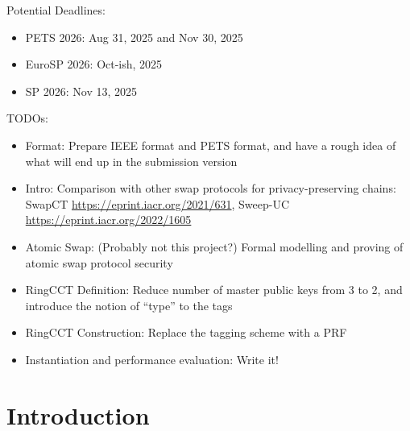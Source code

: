 
\begin{todobox}
    Potential Deadlines: 
    \begin{itemize}
        \item PETS 2026: Aug 31, 2025 and Nov 30, 2025
        \item EuroSP 2026: Oct-ish, 2025 
        \item SP 2026: Nov 13, 2025 
    \end{itemize}

    TODOs:
    \begin{itemize}
        \item Format: Prepare IEEE format and PETS format, and have a rough idea of what will end up in the submission version
        \item Intro: Comparison with other swap protocols for privacy-preserving chains: SwapCT \url{https://eprint.iacr.org/2021/631}, Sweep-UC \url{https://eprint.iacr.org/2022/1605}
        \item Atomic Swap: (Probably not this project?) Formal modelling and proving of atomic swap protocol security
        \item RingCCT Definition: Reduce number of master public keys from 3 to 2, and introduce the notion of ``type'' to the tags
        \item RingCCT Construction: Replace the tagging scheme with a PRF
        \item Instantiation and performance evaluation: Write it!
    \end{itemize}
\end{todobox}

\section{Introduction}

